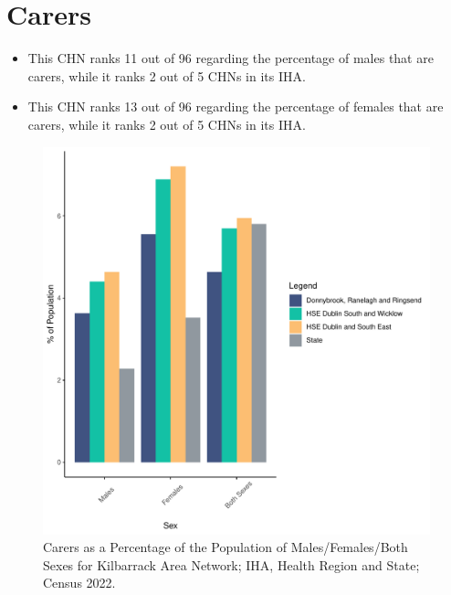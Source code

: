 \documentclass{article}
\begin{document}
\section{Carers}\label{sect:Carers}
\begin{itemize}
\item This CHN ranks  11 out of 96 regarding the percentage of males that are carers, while it ranks   2 out of 5 CHNs in its IHA.
\item This CHN ranks  13 out of 96 regarding the percentage of females that are carers, while it ranks   2 out of 5 CHNs in its IHA.
\end{itemize}
\begin{figure}[H]
	\centering
	\includegraphics[width = 150mm]{../figures/CareED.pdf}
	\caption{Carers as a Percentage of the Population of Males/Females/Both Sexes for Kilbarrack Area Network; IHA, Health Region and State; Census 2022.}
	\label{fig:2ae19629-1a6a-13a3-e055-000000000001}
	\end{figure}
\end{document}
